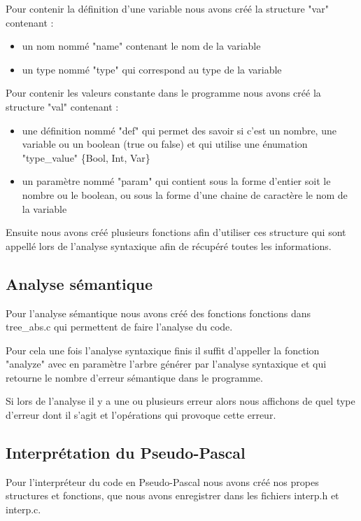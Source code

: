 \documentclass{report}
\begin{document}
Pour contenir la définition d'une variable nous avons créé la structure "var" contenant :
\begin{itemize}
\item un nom nommé "name" contenant le nom de la variable
\item un type nommé "type" qui correspond au type de la variable
\end{itemize}
\bigskip

Pour contenir les valeurs constante dans le programme nous avons créé la structure "val" contenant :
\begin{itemize}
\item une définition nommé "def" qui permet des savoir si c'est un nombre, une variable ou un boolean (true ou false) et qui utilise une énumation "type\_value" \{Bool, Int, Var\}
\item un paramètre nommé "param" qui contient sous la forme d'entier soit le nombre ou le boolean, ou sous la forme d'une chaine de caractère le nom de la variable
\end{itemize}
\bigskip

Ensuite nous avons créé plusieurs fonctions afin d'utiliser ces structure qui sont appellé lors de l'analyse syntaxique afin de récupéré toutes les informations. 

\subsection{Analyse sémantique}
Pour l'analyse sémantique nous avons créé des fonctions fonctions dans tree\_abs.c qui permettent de faire l'analyse du code.

Pour cela une fois l'analyse syntaxique finis il suffit d'appeller la fonction "analyze" avec en paramètre l'arbre générer par l'analyse syntaxique et qui retourne le nombre d'erreur sémantique dans le programme.

Si lors de l'analyse il y a une ou plusieurs erreur alors nous affichons de quel type d'erreur dont il s'agit et l'opérations qui provoque cette erreur.

\subsection{Interprétation du Pseudo-Pascal}
Pour l'interpréteur du code en Pseudo-Pascal nous avons créé nos propes structures et fonctions, que nous avons enregistrer dans les fichiers interp.h et interp.c.\\
\end{document}
